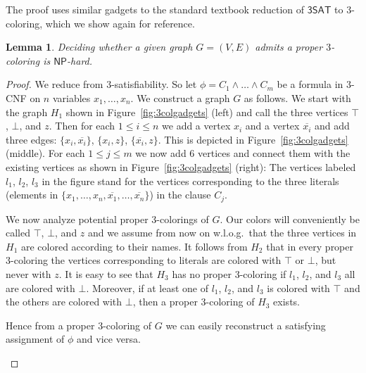 \documentclass[10pt,a4paper]{article}
\numberwithin{equation}{section}
\newtheorem{lemma}[equation]{Lemma}
\theoremstyle{definition}
\newcommand{\NP}{\ensuremath{\mathsf{NP}}}
\newcommand{\SAT}{\ensuremath{\mathsf{3SAT}}}
\begin{document}
The proof uses similar gadgets to the standard textbook reduction of $\SAT$ to $3$-coloring, which we show again for reference.
\begin{lemma}
    \label{lem:3colhardness}
    Deciding whether a given graph $G = (V, E)$ admits a proper $3$-coloring is $\NP$-hard.
\end{lemma}
\begin{proof}
    We reduce from $3$-satisfiability.
    So let $\phi = C_1 \land \ldots \land C_m$ be a formula in $3$-CNF on $n$ variables $x_1, \ldots, x_n$.
    We construct a graph $G$ as follows. We start with the graph $H_1$ shown in Figure~\ref{fig:3colgadgets} (left) and call the three vertices $\top$, $\bot$, and $z$.
    Then for each $1 \leq i \leq n$ we add a vertex $x_i$ and a vertex $\overline{x_i}$ and add three edges: $\{x_i,\overline{x_i}\}$, $\{x_i,z\}$, $\{\overline{x_i},z\}$. This is depicted in Figure~\ref{fig:3colgadgets} (middle).
    For each $1 \leq j \leq m$ we now add 6 vertices and connect them with the existing vertices as shown in Figure~\ref{fig:3colgadgets} (right): The vertices labeled $l_1$, $l_2$, $l_3$ in the figure stand for the vertices corresponding to the three literals (elements in $\{x_1,\ldots,x_n,\overline{x_1},\ldots,\overline{x_n}\}$) in the clause $C_j$.
    
    We now analyze potential proper 3-colorings of $G$. Our colors will conveniently be called $\top$, $\bot$, and $z$ and we assume from now on w.l.o.g.\ that the three vertices in $H_1$ are colored according to their names. It follows from $H_2$ that in every proper 3-coloring the vertices corresponding to literals are colored with $\top$ or $\bot$, but never with $z$.
    It is easy to see that $H_3$ has no proper 3-coloring if $l_1$, $l_2$, and $l_3$ all are colored with $\bot$.
    Moreover, if at least one of $l_1$, $l_2$, and $l_3$ is colored with $\top$ and the others are colored with $\bot$, then a proper 3-coloring of $H_3$ exists.
    
    Hence from a proper 3-coloring of $G$ we can easily reconstruct a satisfying assignment of $\phi$ and vice versa.
    \begin{figure}[tpb]
        \centering
        \hskip 20pt
\end{figure}
\end{proof}
\end{document}
